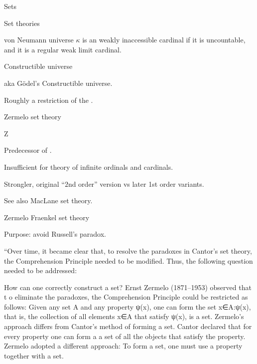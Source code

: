 \begin{plSection}{Sets}
\begin{plSection}{Set theories}
\begin{plSection}{von Neumann universe}
$\kappa$ is an weakly inaccessible cardinal 
if it is uncountable,
and
it is a regular weak limit 
cardinal\cite{wiki:RegularCardinal,wiki:LimitCardinal}.
\end{plSection}%
\begin{plSection}{Constructible universe}
\label{sec:Constructible_universe}

aka G\"{o}del's Constructible 
universe\cite{wiki:ConstructibleUniverse}.

Roughly a restriction of the . 
\end{plSection}%
\begin{plSection}{Zermelo set theory}
\label{sec:Zermelo_set_theory}

\textsf{Z}\cite{wiki:ZermeloSetTheory}

Predecessor of .

Insufficient for theory of infinite 
ordinals\cite{wiki:OrdinalNumber}
and cardinals.

Strongler, original ``$2$nd order'' version 
vs  later 1st order variants.

See also MacLane set theory\cite{MacLane:1986:MathFormFunction}.
\end{plSection}%
\begin{plSection}{Zermelo Fraenkel set theory}
\label{sec:Zermelo-Fraenkel-set-theory}

Purpose: avoid Russell's paradox\cite{wiki:RussellParadox}.

``Over time, it became clear that, to resolve the 
paradoxes in Cantor’s set theory, the Comprehension Principle 
needed to be modified. Thus, the following question needed to 
be addressed:

How can one correctly construct a set? 
Ernst Zermelo (1871–1953) observed that t
o eliminate the paradoxes, 
the Comprehension Principle could be restricted as follows: 
Given any set A and any property ψ(x), 
one can form the set {x∈A:ψ(x)}, that is, 
the collection of all elements x∈A that satisfy ψ(x), is a set.
Zermelo’s approach differs from Cantor’s method of forming a set. 
Cantor declared that for every property one can form 
a a set of all the objects that satisfy the property.
Zermelo adopted a different approach: 
To form a set, one must use a property together with a set.


\end{plSection}
\end{plSection}
\end{plSection}
